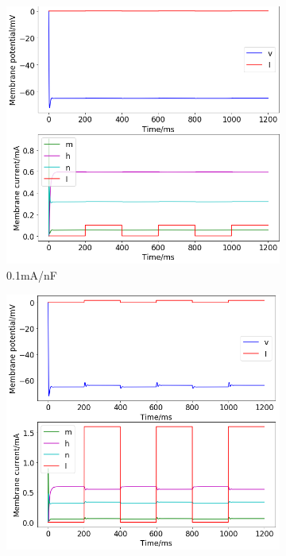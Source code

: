 \documentclass[twoside,twocolumn]{article}
\begin{document}
\onecolumn

\begin{figure}[h]
  \centering
  \begin{subfigure}[t]{0.49\textwidth}
    \includegraphics[width=\linewidth]{a0-1}
  \caption{0.1mA/nF}
  \label{sub:2a0-1}
  \end{subfigure}
  \begin{subfigure}[t]{0.49\textwidth}
    \includegraphics[width=\linewidth]{a1-6}

\end{subfigure}
\end{figure}
\end{document}
